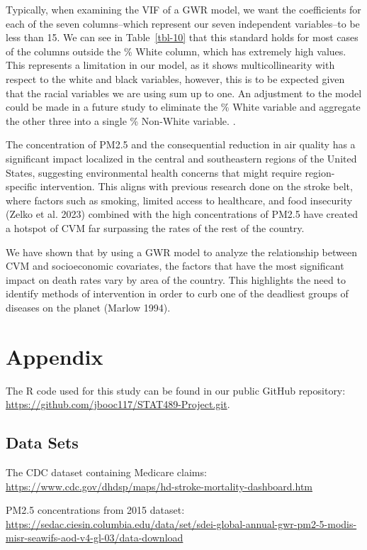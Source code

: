 \documentclass[
]{article}
\begin{document}
Typically, when examining the VIF of a GWR model, we want the
coefficients for each of the seven columns--which represent our seven
independent variables--to be less than 15. We can see in
Table~\ref{tbl-10} that this standard holds for most cases of the
columns outside the \% White column, which has extremely high values.
This represents a limitation in our model, as it shows multicollinearity
with respect to the white and black variables, however, this is to be
expected given that the racial variables we are using sum up to one. An
adjustment to the model could be made in a future study to eliminate the
\% White variable and aggregate the other three into a single \%
Non-White variable. .

The concentration of PM2.5 and the consequential reduction in air
quality has a significant impact localized in the central and
southeastern regions of the United States, suggesting environmental
health concerns that might require region-specific intervention. This
aligns with previous research done on the stroke belt, where factors
such as smoking, limited access to healthcare, and food insecurity
(Zelko et al. 2023) combined with the high concentrations of PM2.5 have
created a hotspot of CVM far surpassing the rates of the rest of the
country.

We have shown that by using a GWR model to analyze the relationship
between CVM and socioeconomic covariates, the factors that have the most
significant impact on death rates vary by area of the country. This
highlights the need to identify methods of intervention in order to curb
one of the deadliest groups of diseases on the planet (Marlow 1994).

\section{Appendix}\label{appendix}

The R code used for this study can be found in our public GitHub
repository: \url{https://github.com/jbooc117/STAT489-Project.git}.

\subsection{Data Sets}\label{data-sets}

The CDC dataset containing Medicare claims:
\url{https://www.cdc.gov/dhdsp/maps/hd-stroke-mortality-dashboard.htm}

PM2.5 concentrations from 2015 dataset:
\url{https://sedac.ciesin.columbia.edu/data/set/sdei-global-annual-gwr-pm2-5-modis-misr-seawifs-aod-v4-gl-03/data-download}
\end{document}
